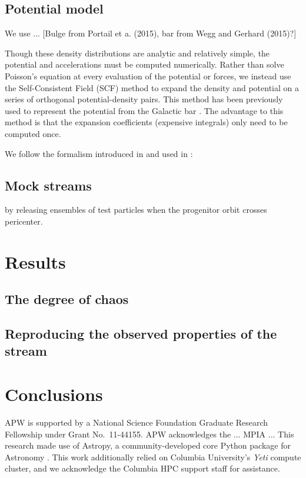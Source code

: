 \documentclass[letterpaper,12pt,preprint]{aastex}
\begin{document}
\subsection{Potential model}\label{sec:potential}

We use ...
[Bulge from Portail et a. (2015), bar from Wegg and Gerhard (2015)?]

Though these density distributions are analytic and relatively simple, the potential and accelerations must be computed numerically. Rather than solve Poisson's equation at every evaluation of the potential or forces, we instead use the Self-Consistent Field (SCF) method \citep{hernquist92} to expand the density and potential on a series of orthogonal potential-density pairs. This method has been previously used to represent the potential from the Galactic bar \citep{zhao96, wangzhao12}. The advantage to this method is that the expansion coefficients (expensive integrals) only need to be computed once.

We follow the formalism introduced in \cite{hernquist92} and used in \cite{lowing11}: 


\subsection{Mock streams}\label{sec:mocks}

by releasing ensembles of test particles when the progenitor orbit crosses pericenter.

\section{Results}

\subsection{The degree of chaos}\label{sec:results1}

\subsection{Reproducing the observed properties of the stream}\label{sec:results2}

\section{Conclusions}\label{sec:conclusions}

\acknowledgements
APW is supported by a National Science Foundation Graduate Research Fellowship under Grant No.\ 11-44155.
APW acknowledges the ... MPIA ...
This research made use of Astropy, a community-developed core Python package for Astronomy \citep{astropy13}.
This work additionally relied on Columbia University's \emph{Yeti} compute cluster, and we acknowledge the Columbia HPC support staff for assistance. \\

%
%
\end{document}
